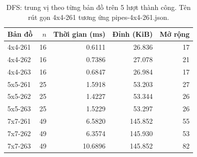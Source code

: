 
\begin{table}[H]\centering\small
\begin{tabular}{@{}lrrrr@{}}\toprule
Bản đồ & $n$ & Thời gian (ms) & Đỉnh (KiB) & Mở rộng\\\midrule
4x4-261 & 16 & 0.6111 & 26.836 & 17 \\
4x4-262 & 16 & 0.7386 & 27.078 & 21 \\
4x4-263 & 16 & 0.6847 & 26.984 & 17 \\
5x5-261 & 25 & 1.5918 & 53.203 & 27 \\
5x5-262 & 25 & 1.4227 & 53.344 & 26 \\
5x5-263 & 25 & 1.5229 & 53.297 & 26 \\
7x7-261 & 49 & 6.5820 & 145.852 & 55 \\
7x7-262 & 49 & 6.3574 & 145.930 & 53 \\
7x7-263 & 49 & 10.6896 & 145.852 & 82 \\
\bottomrule\end{tabular}
\caption{DFS: trung vị theo từng bản đồ trên 5 lượt thành công. Tên rút gọn 4x4-261 tương ứng pipes-4x4-261.json.}
\end{table}
